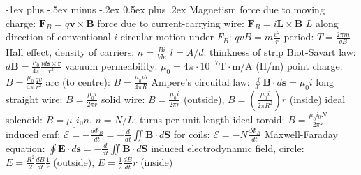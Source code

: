 \documentclass[10pt,landscape]{article}
\makeatletter
\renewcommand{\subsection}{\@startsection{subsection}{2}{0mm}%
                                {-1ex plus -.5ex minus -.2ex}%
                                {0.5ex plus .2ex}%
                                {\normalfont\normalsize\bfseries}}
\newcommand{\spc}{\hspace*{1em}}
\makeatother
\begin{document}
\begin{multicols*}{3}
\subsection{Magnetism}
force due to moving charge: $\mathbf{F}_B=q\mathbf{v}\times \mathbf{B}$
\newline
force due to current-carrying wire: $\mathbf{F}_B=i\mathbf{L}\times \mathbf{B}$ \newline
\spc $L$ along direction of conventional $i$
\newline
circular motion under $F_B$: $qvB=m\frac{v^2}{r}$
\newline
\spc period: $T=\frac{2\pi m}{qB}$
\newline
Hall effect, density of carriers: $n=\frac{Bi}{Vle}$
\newline
\spc $l=A/d$: thinkness of strip
\newline
Biot-Savart law: $d\mathbf{B}=\frac{\mu _0}{4\pi }\frac{id\mathbf{s\times \mathbf{r}}}{r^3}$
\newline
vacuum permeability: $\mu_0=4\pi\cdot10^{-7}\textrm{T}\cdot \textrm{m}/\textrm{A}$ (H/m)
\newline
\spc point charge: $B=\frac{\mu_0}{4\pi}\frac{qv}{r^2}$
\newline
\spc arc (to centre): $B=\frac{\mu _0i\theta }{4\pi R}$
\newline \newline
Ampere's circuital law: $\oint \mathbf{B}\cdot d\mathbf{s}=\mu _0i$
\newline
\spc long straight wire: $B=\frac{\mu _0i}{2\pi r}$
\newline
\spc solid wire: $B=\frac{\mu _0i}{2\pi r}$ (outside), $B=(\frac{\mu _0i}{2\pi R^2})r$ (inside)
\newline
\spc ideal solenoid: $B=\mu _0i_0n$, $n=N/L$: turns per unit length
\newline
\spc ideal toroid: $B=\frac{\mu _0i_0N}{2\pi r}$
\newline \newline
induced emf: $\mathscr{E} =-\frac{d\Phi _B}{dt}=-\frac{d}{dt} \iint \mathbf{B} \cdot d\mathbf{S}$
\newline
\spc for coils: $\mathscr{E} =-N\frac{d\Phi _B}{dt}$
\newline
Maxwell-Faraday equation: $\oint \mathbf{E}\cdot d\mathbf{s}=-\frac{d}{dt} \iint \mathbf{B}\cdot d\mathbf{S}$
\newline
\spc induced electrodynamic field, circle:
\\\spc$E=\frac{R^2}{2}\frac{dB}{dt}\frac{1}{r}$ (outside), $E=\frac{1}{2}\frac{dB}{dt}r$ (inside)


\end{multicols*}
\end{document}
